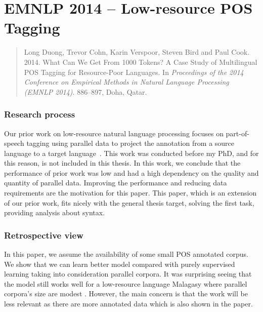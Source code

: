 \documentclass[12pt,twoside,final,hidelinks]{ltthesis}
\theoremstyle{definition}
\begin{document}


\section{EMNLP 2014 -- Low-resource POS Tagging}
\label{sec:emnlp14}
\begin{quote}
Long Duong, Trevor Cohn, Karin Verspoor, Steven Bird and Paul Cook. 2014. What Can We Get From 1000 Tokens? A Case Study of Multilingual POS Tagging for Resource-Poor Languages. In \textit{Proceedings of the 2014 Conference on Empirical Methods in Natural Language Processing (EMNLP 2014)}. 886--897, Doha, Qatar.
\end{quote}
\subsubsection{Research process}
Our prior work on low-resource natural language processing focuses on part-of-speech tagging using parallel data to project the annotation from a source language 
to a target language~\cite{Duongacl13,duongIJCNLP}. This work was conducted before my PhD, and for this reason, is not included in this thesis. In this work, we conclude that the performance of prior work
was low and had a high dependency on the quality and quantity of parallel data. Improving the performance and reducing data requirements  are the motivation for this paper. This paper, which is an extension of our prior work, fits nicely with the general thesis target, solving the first task, providing analysis about syntax. 


\subsubsection{Retrospective view}
In this paper, we assume the availability of some small POS annotated corpus. We show that we can learn better model compared with purely 
supervised learning taking into consideration parallel corpora. It was surprising seeing that the model still works well for a low-resource language Malagasy where parallel corpora's size are modest . However, the main concern is that the work will be less relevant as there are more annotated 
data which is also shown in the paper.%
\end{document}
